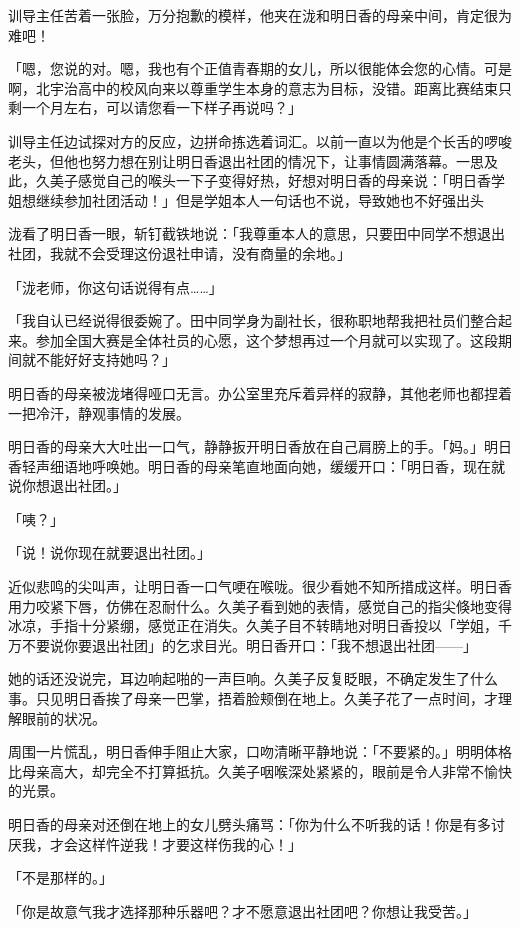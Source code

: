 \documentclass[UTF8]{ctexart}
\begin{document}
    训导主任苦着一张脸，万分抱歉的模样，他夹在泷和明日香的母亲中间，肯定很为难吧！ 

    「嗯，您说的对。嗯，我也有个正值青春期的女儿，所以很能体会您的心情。可是啊，北宇治高中的校风向来以尊重学生本身的意志为目标，没错。距离比赛结束只剩一个月左右，可以请您看一下样子再说吗？」 

    训导主任边试探对方的反应，边拼命拣选着词汇。以前一直以为他是个长舌的啰唆老头，但他也努力想在别让明日香退出社团的情况下，让事情圆满落幕。一思及此，久美子感觉自己的喉头一下子变得好热，好想对明日香的母亲说：「明日香学姐想继续参加社团活动！」但是学姐本人一句话也不说，导致她也不好强出头 

    泷看了明日香一眼，斩钉截铁地说：「我尊重本人的意思，只要田中同学不想退出社团，我就不会受理这份退社申请，没有商量的余地。」 

    「泷老师，你这句话说得有点……」 

    「我自认已经说得很委婉了。田中同学身为副社长，很称职地帮我把社员们整合起来。参加全国大赛是全体社员的心愿，这个梦想再过一个月就可以实现了。这段期间就不能好好支持她吗？」 

    明日香的母亲被泷堵得哑口无言。办公室里充斥着异样的寂静，其他老师也都捏着一把冷汗，静观事情的发展。 

    明日香的母亲大大吐出一口气，静静扳开明日香放在自己肩膀上的手。「妈。」明日香轻声细语地呼唤她。明日香的母亲笔直地面向她，缓缓开口：「明日香，现在就说你想退出社团。」 

    「咦？」 

    「说！说你现在就要退出社团。」 

    近似悲鸣的尖叫声，让明日香一口气哽在喉咙。很少看她不知所措成这样。明日香用力咬紧下唇，仿佛在忍耐什么。久美子看到她的表情，感觉自己的指尖倏地变得冰凉，手指十分紧绷，感觉正在消失。久美子目不转睛地对明日香投以「学姐，千万不要说你要退出社团」的乞求目光。明日香开口：「我不想退出社团——」 

    她的话还没说完，耳边响起啪的一声巨响。久美子反复眨眼，不确定发生了什么事。只见明日香挨了母亲一巴掌，捂着脸颊倒在地上。久美子花了一点时间，才理解眼前的状况。 

    周围一片慌乱，明日香伸手阻止大家，口吻清晰平静地说：「不要紧的。」明明体格比母亲高大，却完全不打算抵抗。久美子咽喉深处紧紧的，眼前是令人非常不愉快的光景。 

    明日香的母亲对还倒在地上的女儿劈头痛骂：「你为什么不听我的话！你是有多讨厌我，才会这样忤逆我！才要这样伤我的心！」 

    「不是那样的。」 

    「你是故意气我才选择那种乐器吧？才不愿意退出社团吧？你想让我受苦。」 
\end{document}
